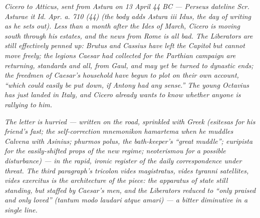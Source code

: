 
\textit{Cicero to Atticus, sent from Astura on 13 April 44 BC ---
Perseus dateline \textit{Scr. Asturae it Id. Apr. a. 710 (44)}
(the body adds \textit{Astura iii Idus}, the day of writing as
he sets out). Less than a month after the Ides of March, Cicero
is moving south through his estates, and the news from Rome is
all bad. The Liberators are still effectively penned up: Brutus
and Cassius have left the Capitol but cannot move freely; the
legions Caesar had collected for the Parthian campaign are
returning, standards and all, from Gaul, and may yet be turned
to dynastic ends; the freedmen of Caesar's household have begun
to plot on their own account, ``which could easily be put down,
if Antony had any sense.'' The young Octavius has just landed in
Italy, and Cicero already wants to know whether anyone is
rallying to him.}

\textit{The letter is hurried --- written on the road, sprinkled
with Greek (\textit{esitesas} for his friend's fast; the
self-correction \textit{mnemonikon hamartema} when he muddles
Calvena with Asinius; \textit{phurmos polus}, the bath-keeper's
``great muddle''; \textit{euripista} for the easily-shifted props
of the new regime; \textit{neoterismou} for a possible
disturbance) --- in the rapid, ironic register of the daily
correspondence under threat. The third paragraph's tricolon
\textit{vides magistratus, vides tyranni satellites, vides
exercitus} is the architecture of the piece: the apparatus of
state still standing, but staffed by Caesar's men, and the
Liberators reduced to ``only praised and only loved''
(\textit{tantum modo laudari atque amari}) --- a bitter
diminutive in a single line.}
